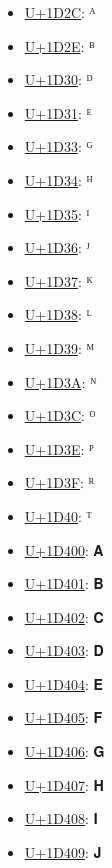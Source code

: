 \begin{itemize}
	\item \href{https://decodeunicode.org/en/u+1D2C}{U+1D2C}: ᴬ
	\item \href{https://decodeunicode.org/en/u+1D2E}{U+1D2E}: ᴮ
	\item \href{https://decodeunicode.org/en/u+1D30}{U+1D30}: ᴰ
	\item \href{https://decodeunicode.org/en/u+1D31}{U+1D31}: ᴱ
	\item \href{https://decodeunicode.org/en/u+1D33}{U+1D33}: ᴳ
	\item \href{https://decodeunicode.org/en/u+1D34}{U+1D34}: ᴴ
	\item \href{https://decodeunicode.org/en/u+1D35}{U+1D35}: ᴵ
	\item \href{https://decodeunicode.org/en/u+1D36}{U+1D36}: ᴶ
	\item \href{https://decodeunicode.org/en/u+1D37}{U+1D37}: ᴷ
	\item \href{https://decodeunicode.org/en/u+1D38}{U+1D38}: ᴸ
	\item \href{https://decodeunicode.org/en/u+1D39}{U+1D39}: ᴹ
	\item \href{https://decodeunicode.org/en/u+1D3A}{U+1D3A}: ᴺ
	\item \href{https://decodeunicode.org/en/u+1D3C}{U+1D3C}: ᴼ
	\item \href{https://decodeunicode.org/en/u+1D3E}{U+1D3E}: ᴾ
	\item \href{https://decodeunicode.org/en/u+1D3F}{U+1D3F}: ᴿ
	\item \href{https://decodeunicode.org/en/u+1D40}{U+1D40}: ᵀ
	\item \href{https://decodeunicode.org/en/u+1D400}{U+1D400}: 𝐀
	\item \href{https://decodeunicode.org/en/u+1D401}{U+1D401}: 𝐁
	\item \href{https://decodeunicode.org/en/u+1D402}{U+1D402}: 𝐂
	\item \href{https://decodeunicode.org/en/u+1D403}{U+1D403}: 𝐃
	\item \href{https://decodeunicode.org/en/u+1D404}{U+1D404}: 𝐄
	\item \href{https://decodeunicode.org/en/u+1D405}{U+1D405}: 𝐅
	\item \href{https://decodeunicode.org/en/u+1D406}{U+1D406}: 𝐆
	\item \href{https://decodeunicode.org/en/u+1D407}{U+1D407}: 𝐇
	\item \href{https://decodeunicode.org/en/u+1D408}{U+1D408}: 𝐈
	\item \href{https://decodeunicode.org/en/u+1D409}{U+1D409}: 𝐉

\end{itemize}
